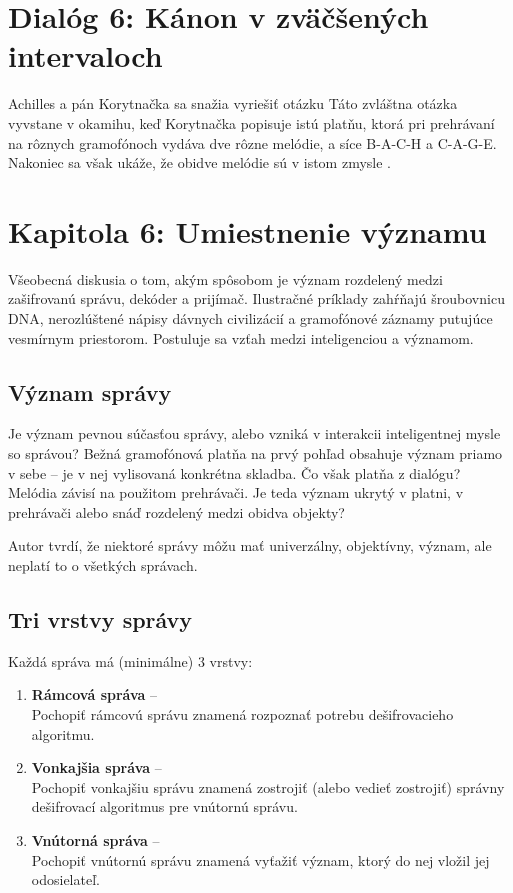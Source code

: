 \documentclass[12pt]{article}
\begin{document}
\section*{Dialóg 6: Kánon v zväčšených intervaloch}

Achilles a pán Korytnačka sa snažia vyriešiť otázku  Táto zvláštna otázka vyvstane v okamihu, keď Korytnačka popisuje istú platňu, ktorá pri prehrávaní na rôznych gramofónoch vydáva dve rôzne melódie, a síce B-A-C-H a C-A-G-E. Nakoniec sa však ukáže, že obidve melódie sú v istom zmysle .

\setcounter{section}{6}
\section*{Kapitola 6: Umiestnenie významu}

Všeobecná diskusia o tom, akým spôsobom je význam rozdelený medzi zašifrovanú správu, dekóder a prijímač. Ilustračné príklady zahŕňajú šroubovnicu DNA, nerozlúštené nápisy dávnych civilizácií a gramofónové záznamy putujúce vesmírnym priestorom. Postuluje sa vzťah medzi inteligenciou a  významom.

\subsection{Význam správy}

Je význam pevnou súčasťou správy, alebo vzniká v interakcii inteligentnej mysle so správou? Bežná gramofónová platňa na prvý pohľad obsahuje význam priamo v sebe -- je v nej vylisovaná konkrétna skladba. Čo však platňa z dialógu? Melódia závisí na použitom prehrávači. Je teda význam ukrytý v platni, v prehrávači alebo snáď rozdelený medzi obidva objekty?

Autor tvrdí, že niektoré správy môžu mať univerzálny, objektívny, význam, ale neplatí to o všetkých správach.

\subsection{Tri vrstvy správy}

Každá správa má (minimálne) 3 vrstvy:
\begin{enumerate}
\item \textbf{Rámcová správa} -- \\ Pochopiť rámcovú správu znamená rozpoznať potrebu dešifrovacieho algoritmu.
\item \textbf{Vonkajšia správa} -- \\Pochopiť vonkajšiu správu znamená zostrojiť (alebo vedieť zostrojiť) správny dešifrovací algoritmus pre vnútornú správu.
\item \textbf{Vnútorná správa} -- \\Pochopiť vnútornú správu znamená vyťažiť význam, ktorý do nej vložil jej odosielateľ.
\end{enumerate}
\end{document}

